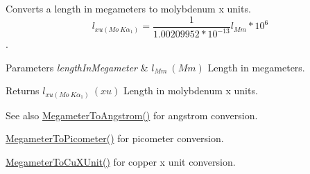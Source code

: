 Converts a length in megameters to molybdenum x units. \[ l_{xu(Mo\ K\alpha_1)}=\frac{1}{1.00209952*10^{-13}} l_{Mm} * 10^{6}\]. 


\begin{DoxyParams}{Parameters}
{\em length\+In\+Megameter} & $ l_{Mm}\ (Mm)$ Length in megameters. \\
\hline
\end{DoxyParams}
\begin{DoxyReturn}{Returns}
$ l_{xu(Mo\ K\alpha_1)}\ (xu)$ Length in molybdenum x units. 
\end{DoxyReturn}
\begin{DoxySeeAlso}{See also}
\mbox{\hyperlink{group___e_g_x_math-_conversions-_length_conversions-_s_i-_megameter-_non-_s_i_gac4c7e615f4ec3d000ac341a5bf9a79a0}{Megameter\+To\+Angstrom()}} for angstrom conversion. 

\mbox{\hyperlink{group___e_g_x_math-_conversions-_length_conversions-_s_i-_megameter-_s_i_ga0f6585bdcd16b6748b6c4d9116dd955c}{Megameter\+To\+Picometer()}} for picometer conversion. 

\mbox{\hyperlink{group___e_g_x_math-_conversions-_length_conversions-_s_i-_megameter-_non-_s_i_gae44ce2fd3e740a5aec1546ed10c83447}{Megameter\+To\+Cu\+X\+Unit()}} for copper x unit conversion. 
\end{DoxySeeAlso}
